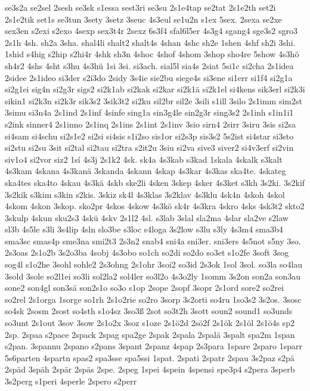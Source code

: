 {se3s2a
se2sel
2sesh
se3sk
s1essa
sest3ri
se3su
2s1e4tap
se2tat
2s1e2th
set2i
2s1e2tik
set1s
se3tun
3sety
3setz
3seuc
4s3eul
se1u2n
s1ex
5sex.
2sexa
se2xe
sex3en
s2exi
s2exo
4sexp
sex3t4r
2sexz
6s3f4
sfal6l5er
4s3g4
sgang4
sge3s2
sgro3
2s1h
4sh.
sh2a
3sha.
shal4li
shalt2
shalt4s
4shan
4shc
sh2e
1shen
4shf
sh2i
3shi.
1shid
s4hig
s2hip
s2hi4r
4shk
sh3n
4shoc
4shof
4shom
3shop
sho4re
5show
4s3hö
sh4r2
4shs
4sht
s3hu
4s3hü
1si
3si.
si3ach.
sial5l
sia4s
2siat
5si1c
si2cha
2s1idea
2sidee
2s1ideo
si3der
s2i3do
2sidy
3s4ie
sie2bu
siege4s
si3ene
si1err
si1f4
si2g1a
si2g1ei
sig4n
si2g3r
sigs2
si2k1ab
si2kak
si2kar
si2k1ä
si2k1el
si4kens
sik3erl
si2k3i
sikin1
si2k3n
si2k3r
sik3s2
3sik3t2
si2ku
sil2br
sil2e
3sili
s1ill
3silo
2s1imm
sim2st
3simu
si3n4a
2s1ind
2s1inf
4sinfe
sing1a
sin3g4le
sin2g3r
sing3s2
2s1inh
s1in1i1
s2ink
sinner4
2s1inno
2s1inq
2s1ins
2s1int
2s1inv
3sio
sirn4
2sirr
3siru
3sis
si2sa
si4sam
si4schu
si2s1e2
si2si
si4sis
s1i2so
sis1or
si2s3p
sis3s2
5s2ist
si4star
si3sto
si2stu
si2su
3sit
si2tal
si2tau
si2tra
s2it2u
3siu
si2va
sive3
siver2
si4v3erf
si2vin
siv1o4
si2vor
siz2
1sí
4s3j
2s1k2
4sk.
sk4a
4s3kab
s3kad
1skala
4skalk
s3kalt
4s3kam
4skana
4s3kanä
3skanda
4skann
4skap
4s3kar
4s3kas
ska4te.
4skateg
ska4tes
ska4to
4skau
4s3kä
4skb
ske2li
4sken
3skep
4sker
4s3ket
s3kh
3s2ki.
3s2kif
3s2kik
s3kim
s3kin
s2kis.
3skiz
sk4l
4s3klas
3s2klav
4s3klu
4sk4n
4skoh
4skol
4skom
4skon
3skop.
sko2pr
4skos
4skow
4s3kö
sk4r
4s3kra
4skro
4sks
4sk3t2
skto2
3skulp
4skun
sku2s3
4skü
4skv
2s1l2
4sl.
s3lab
3slal
sla2ma
4slar
sla2ve
s2law
sl3b
4s5le
s3li
3s4lip
4sln
slo3be
s3loc
s4loga
3s2low
s3lu
s3ly
4s3m4
sma3b4
sma3sc
smas4p
sme3na
smi2t3
2s3n2
snab4
sni4a
sni3er.
sni3ers
4s5not
s5ny
3so.
2s3oas
2s1o2b
3s2o3ba
4sobj
4s3obo
so1ch
so2di
so2do
so3et
s1o2fe
3soft
3sog
sog4l
s1o2he
3sohl
sohle2
2s3ohng
2s1ohr
3soi2
so3id
2s3ok
1sol
3sol.
so3la
so4lau
3sold
3sole
so2l1ei
so3li
sol2la2
sol4ler
so3l2o
4s3o2ly
1somm
3s2on
son2a
son3au
sone2
son4gl
son3sä
son2s1o
so3o
s1op
2sope
2sopf
3sopr
2s1ord
sore2
so2rei
so2rel
2s1orga
1sorge
so1rh
2s1o2rie
so2ro
3sorp
3s2orti
so4ru
1so3s2
3s2os.
3sosc
so4sk
2sosm
2sost
so4sth
s1o4sz
3so3ß
2sot
so3t2h
3sott
soun2
sound1
so3unds
so3unt
2s1out
3sov
3sow
2s1o2x
3soz
s1oze
2s1ö2d
2sö2f
2s1ök
2s1öl
2s1ö4s
sp2
2sp.
2spaa
s2pace
2spack
2spag
spa2ge
2spak
2spala
2spalä
3spalt
spa2m
1span
s2pan.
3spannu
2spano
s2pans
3spant
2spanz
4spap
2s3para
1spare
2sparo
1sparr
5s6parten
4spartn
spas2
spa3sse
spa5ssi
1spat.
2spati
2spatr
2spau
3s2paz
s2pä
2späd
3späh
2spär
2späs
2spe.
2speg
1spei
4spein
4spensi
spe3p4
s2pera
3sperb
3s2perg
s1peri
4sperle
2spero
s2perr
}
